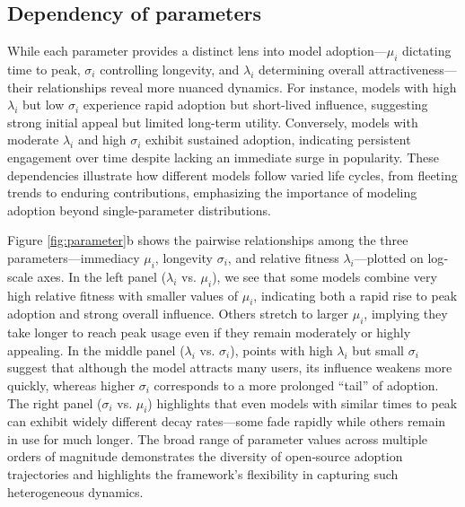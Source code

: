 \documentclass{article} %
\begin{document}
    \subsection{Dependency of parameters}
        While each parameter provides a distinct lens into model adoption—$\mu_i$ dictating time to peak, $\sigma_i$ controlling longevity, and $\lambda_i$ determining overall attractiveness—their relationships reveal more nuanced dynamics. For instance, models with high $\lambda_i$ but low $\sigma_i$ experience rapid adoption but short-lived influence, suggesting strong initial appeal but limited long-term utility. Conversely, models with moderate $\lambda_i$ and high $\sigma_i$ exhibit sustained adoption, indicating persistent engagement over time despite lacking an immediate surge in popularity. These dependencies illustrate how different models follow varied life cycles, from fleeting trends to enduring contributions, emphasizing the importance of modeling adoption beyond single-parameter distributions.
        
        Figure \ref{fig:parameter}b shows the pairwise relationships among the three parameters—immediacy $\mu_i$, longevity $\sigma_i$, and relative fitness $\lambda_i$—plotted on log‐scale axes. In the left panel ($\lambda_i$ vs. $\mu_i$), we see that some models combine very high relative fitness with smaller values of $\mu_i$, indicating both a rapid rise to peak adoption and strong overall influence. Others stretch to larger $\mu_i$, implying they take longer to reach peak usage even if they remain moderately or highly appealing. In the middle panel ($\lambda_i$ vs. $\sigma_i$), points with high $\lambda_i$ but small $\sigma_i$ suggest that although the model attracts many users, its influence weakens more quickly, whereas higher $\sigma_i$ corresponds to a more prolonged “tail” of adoption. The right panel ($\sigma_i$ vs. $\mu_i$) highlights that even models with similar times to peak can exhibit widely different decay rates—some fade rapidly while others remain in use for much longer. The broad range of parameter values across multiple orders of magnitude demonstrates the diversity of open‐source adoption trajectories and highlights the framework's flexibility in capturing such heterogeneous dynamics.
        
\end{document}
